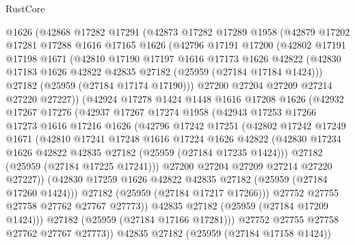 \begin{lexlean}{RustCore}
\begin{coremodule}
    @1626
    (@42868
      @17282
      @17291
      (@42873
        @17282
        @17289
        @1958
        (@42879
          @17202
          @17281
          @17288
          @1616
          @17165
          @1626
          (@42796
            @17191
            @17200
            (@42802
              @17191
              @17198
              @1671
              (@42810
                @17190
                @17197
                @1616
                @17173
                @1626
                @42822
                (@42830 @17183 @1626 @42822 @42835 @27182 (@25959 (@27184 @17184 @1424)))
                @27182
                (@25959 (@27184 @17174 @17190)))
              @27200
              @27204
              @27209
              @27214
              @27220
              @27227))
          (@42924
            @17278
            @1424
            @1448
            @1616
            @17208
            @1626
            (@42932
              @17267
              @17276
              (@42937
                @17267
                @17274
                @1958
                (@42943
                  @17253
                  @17266
                  @17273
                  @1616
                  @17216
                  @1626
                  (@42796
                    @17242
                    @17251
                    (@42802
                      @17242
                      @17249
                      @1671
                      (@42810
                        @17241
                        @17248
                        @1616
                        @17224
                        @1626
                        @42822
                        (@42830 @17234 @1626 @42822 @42835 @27182 (@25959 (@27184 @17235 @1424)))
                        @27182
                        (@25959 (@27184 @17225 @17241)))
                      @27200
                      @27204
                      @27209
                      @27214
                      @27220
                      @27227))
                  (@42830 @17259 @1626 @42822 @42835 @27182 (@25959 (@27184 @17260 @1424)))
                  @27182
                  (@25959 (@27184 @17217 @17266)))
                @27752
                @27755
                @27758
                @27762
                @27767
                @27773))
            @42835
            @27182
            (@25959 (@27184 @17209 @1424)))
          @27182
          (@25959 (@27184 @17166 @17281)))
        @27752
        @27755
        @27758
        @27762
        @27767
        @27773))
    @42835
    @27182
    (@25959 (@27184 @17158 @1424))

\end{coremodule}
\end{lexlean}
